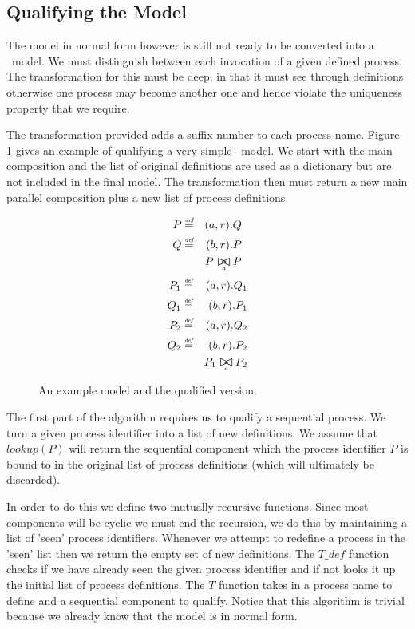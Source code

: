 \subsection{Qualifying the Model}

The model in normal form however is still not ready to be converted into a
\hydra\ model. We must distinguish between each invocation of a given defined
process. The transformation for this must be deep, in that it must see through
definitions otherwise one process may become another one and hence violate
the uniqueness property that we require.

The transformation provided adds a suffix number to each process name.
Figure
\ref{figure:qualifyModel}
gives an example of qualifying a very simple \pepa\ model.
We start with the main composition and the list of original definitions
are used as a dictionary but are not included in the final model.
The transformation then must return a new main parallel composition
plus a new list of process definitions.

\begin{figure}
\begin{eqnarray*}
P & \rmdef & (a, r) . Q \\
Q & \rmdef & (b, r) . P \\
  & & P \sync{a} P
\end{eqnarray*}
\begin{eqnarray*}
P_1 & \rmdef & (a, r) . Q_1 \\
Q_1 & \rmdef & (b, r) . P_1 \\
P_2 & \rmdef & (a, r) . Q_2 \\
Q_2 & \rmdef & (b, r) . P_2 \\
  & & P_1 \sync{a} P_2
\end{eqnarray*}
\caption{
\label{figure:qualifyModel}
An example model and the qualified version.
}
\end{figure}

The first part of the algorithm requires us to qualify a sequential
process. We turn a given process identifier into a list of new definitions.
We assume that $lookup(P)$ will return the sequential component which
the process identifier $P$ is bound to in the original list of process
definitions (which will ultimately be discarded).

In order to do this we define two mutually recursive functions.
Since most components will be cyclic we must end the recursion,
we do this by maintaining a list of 'seen' process identifiers.
Whenever we attempt to redefine a process in the 'seen' list then
we return the empty set of new definitions.
The $T\_def$ function checks if we have already seen the given
process identifier and if not looks it up the initial list of
process definitions. The $T$ function takes in a process name
to define and a sequential component to qualify.
Notice that this algorithm is trivial because we already know
that the model is in normal form.

